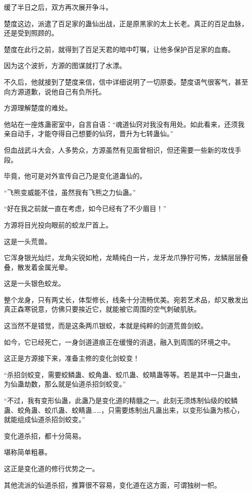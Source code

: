 \begin{this_body}
缓了半日之后，双方再次展开争斗。

楚度这边，派遣了百足家的蛊仙出战，正是原黑家的太上长老。真正的百足血脉，还是受到照顾的。

楚度在此行之前，就得到了百足天君的暗中叮嘱，让他多保护百足家的血裔。

因为这个波折，方源的图谋就打了水漂。

不久后，他就接到了楚度来信，信中详细说明了一切原委。楚度语气很客气，甚至向方源道歉，说他自己有负所托。

方源理解楚度的难处。

他站在一座炼蛊密室中，自言自语：“魂道仙窍对我没有用处。如此看来，还须我亲自动手，才能夺得自己想要的仙窍，晋升为七转蛊仙。”

但血战武斗大会，人多势众，方源虽然有见面曾相识，但还需要一些新的攻伐手段。

毕竟，他可是对外宣传自己乃是变化道蛊仙的。

“飞熊变威能不佳，虽然我有飞熊之力仙蛊。”

“好在我之前就一直在考虑，如今已经有了不少眉目！”

方源将目光投向眼前的蛟龙尸首上。

这是一头荒兽。

它浑身银光灿烂，龙角尖锐如枪，龙睛纯白一片，龙牙龙爪狰狞可怖，龙鳞层层叠叠，散发着金属光晕。

这是一头银色蛟龙。

整个龙身，只有两丈长，体型修长，线条十分流畅优美。宛若艺术品，却又散发出真正森寒锐意，仿佛只要挨近它，就能被它周围的空气刺破肌肤。

这当然不是错觉，而是这条两爪银蛟，本就是纯粹的剑道荒兽剑蛟。

如今，它已经死亡，一身剑道道痕正在缓慢的消退，融入到周围的环境之中。

这正是方源接下来，准备主修的变化剑蛟变！

“杀招剑蛟变，需要蛟鳞蛊、蛟角蛊、蛟爪蛊、蛟睛蛊等等。若是其中一只蛊虫，为仙蛊劫数，那么就是仙道杀招剑蛟变。”

“不过，我有变形仙蛊，此蛊乃是变化道的精髓之一。此刻无须炼制仙级的蛟鳞蛊、蛟角蛊、蛟爪蛊、蛟睛蛊……，只需要炼制出凡蛊出来，以变形仙蛊为核心，就能组成仙道杀招剑蛟变。”

变化道杀招，都十分简易。

堪称简单粗暴。

这正是变化道的修行优势之一。

其他流派的仙道杀招，推算很不容易，变化道在这方面，可谓独树一帜。


\end{this_body}
